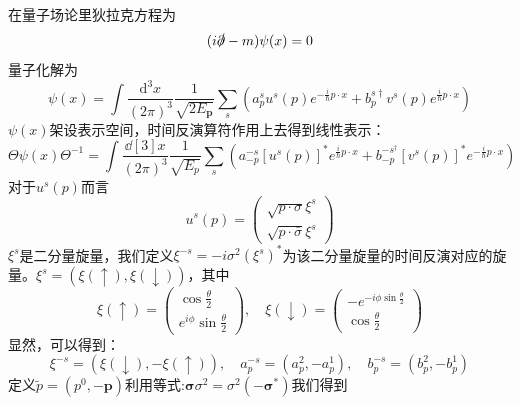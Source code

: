 \documentclass{article}
\numberwithin{equation}{subsection}
\begin{document}
在量子场论里狄拉克方程为
\begin{equation}
    (i\slashed{\partial}-m)\psi(x)=0
\end{equation}
量子化解为
\begin{equation}
    \psi(x)=\int\frac{\mathrm{d}^3x}{(2\pi)^3}\frac{1}{\sqrt{2E_{\mathbf{p}}}}\sum_{s}\left(a_p^su^s(p)e^{-\frac{i}{\hbar}p\cdot x}+b_p^{s\dagger}v^s(p)e^{\frac{i}{\hbar}p\cdot x}\right)
\end{equation}
$\psi(x)$架设表示空间，时间反演算符作用上去得到线性表示：
\begin{equation}
    \Theta\psi(x)\Theta^{-1}=\int\frac{\dd[3]x}{(2\pi)^3}\frac{1}{\sqrt{E_{p}}}\sum_{s}\left(a_{-p}^{-s}[u^s(p)]^*e^{\frac{i}{\hbar}p\cdot x}+b_{-p}^{-s^\dagger}[v^{s}(p)]^*e^{-\frac{i}{\hbar}p\cdot x}\right)
\end{equation}
对于$u^s(p)$而言
\begin{equation}
    u^{s}(p)=\begin{pmatrix}
        \sqrt{p\cdot\sigma}\xi^s\\
        \sqrt{p\cdot\bar{\sigma}}\xi^s
    \end{pmatrix}
\end{equation}
$\xi^s$是二分量旋量，我们定义$\xi^{-s}=-i\sigma^2(\xi^s)^*$为该二分量旋量的时间反演对应的旋量。$\xi^s=(\xi(\uparrow),\xi(\downarrow))$，其中
\begin{equation}
    \xi(\uparrow)=\begin{pmatrix}
        \cos\frac{\theta}{2}\\
        e^{i\phi}\sin{\frac{\theta}{2}}
    \end{pmatrix},\quad\xi(\downarrow)=\begin{pmatrix}
        -e^{-i\phi\sin\frac{\theta}{2}}\\
        \cos\frac{\theta}{2}
    \end{pmatrix}
\end{equation}
显然，可以得到：
\begin{equation}
    \xi^{-s}=(\xi(\downarrow),-\xi(\uparrow)),\quad a_p^{-s}=(a_p^2,-a_p^1),\quad b_p^{-s}=(b_p^2,-b_p^1)
\end{equation}
定义$\tilde{p}=(p^0,-\mathbf{p})$利用等式:$\mathbf{\sigma}\sigma^2=\sigma^2(-\mathbf{\sigma}^*)$我们得到
\end{document}
